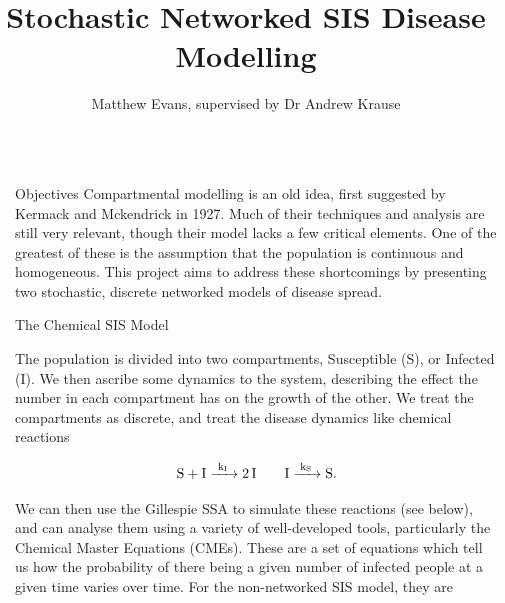\documentclass{beamer}
\title{Stochastic Networked SIS Disease Modelling} %
\author{Matthew Evans, supervised by Dr Andrew Krause} %
\institute{Mathematical Sciences, Durham} %
\newlength{\sepwid}
\newlength{\onecolwid}
\begin{document}
\begin{frame}[t] %

\begin{columns}[t] %

\begin{column}{\sepwid}\end{column} %

\begin{column}{\onecolwid} %


\begin{alertblock}{Objectives}
Compartmental modelling is an old idea, first suggested by Kermack and Mckendrick in 1927\cite{kermackContributionMathematicalTheory1927}. Much of their techniques and analysis are still very relevant, though their model lacks a few critical elements. One of the greatest of these is the assumption that the population is continuous and homogeneous. This project aims to address these shortcomings by presenting two stochastic, discrete networked models of disease spread.
\end{alertblock}

\begin{block}{The Chemical SIS Model}

The population is divided into two compartments, Susceptible (S), or Infected (I). We then ascribe some dynamics to the system, describing the effect the number in each compartment has on the growth of the other. We treat the compartments as discrete, and treat the disease dynamics like chemical reactions

\begin{equation}
	\ce{S + I ->[k_I] 2 I} \qquad \ce{I ->[k_S] S}.
\end{equation}

We can then use the Gillespie SSA \cite{gillespieStochasticSimulationChemical2007} to simulate these reactions (see below), and can analyse them using a variety of well-developed tools, particularly the Chemical Master Equations (CMEs). These are a set of equations which tell us how the probability of there being a given number of infected people at a given time varies over time. For the non-networked SIS model, they are


\end{block}
\end{column}
\end{columns}
\end{frame}
\end{document}

